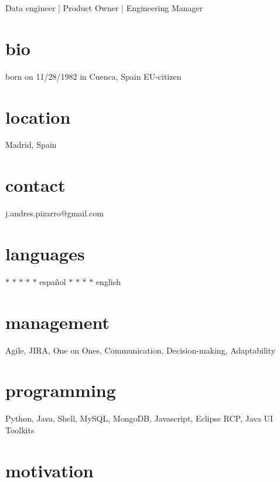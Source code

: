 \documentclass[]{friggeri-cv}
\begin{document}
       {Data engineer | Product Owner | Engineering Manager}



\begin{aside} %
  \section{bio}
  born on 11/28/1982
  in Cuenca, Spain
  EU-citizen
  \section{location}
  Madrid, Spain
  \section{contact}
  j.andres.pizarro@gmail.com
  \section{languages}
  {\color{lightgray} $\ast$}{\color{lightgray} $\ast$}{\color{lightgray} $\ast$}{\color{lightgray} $\ast$}{\color{lightgray} $\ast$} español
  {\color{lightgray} $\ast$}{\color{lightgray} $\ast$}{\color{lightgray} $\ast$}{\color{lightgray} $\ast$} english
  \section{management}
  Agile, JIRA, One on Ones, Communication,
  Decision-making, Adaptability
  \section{programming}
  Python, Java, Shell,
  MySQL, MongoDB, Javascript,
  Eclipse RCP, Java UI Toolkits
\end{aside}


\section{motivation}
\end{document}
